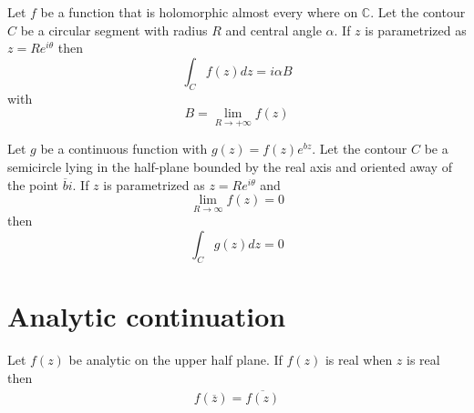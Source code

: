         \begin{theorem}\label{complexcalculus:theorem:great_limit}
		Let $f$ be a function that is holomorphic almost every where on $\mathbb{C}$. Let the contour $C$ be a circular segment with radius $R$ and central angle $\alpha$. If $z$ is parametrized as $z = Re^{i\theta}$ then\[\int_Cf(z)dz = i\alpha B\] with \[B = \lim_{R\rightarrow+\infty}f(z)\]
	\end{theorem}
	
        \begin{theorem}\label{complexcalculus:theorem:jordan}
		Let $g$ be a continuous function with $g(z) = f(z)e^{bz}$. Let the contour $C$ be a semicircle lying in the half-plane bounded by the real axis and oriented away of the point $\overline{b}i$. If $z$ is parametrized as $z=Re^{i\theta}$ and \[\lim_{R\rightarrow\infty}f(z) = 0\] then\[\int_Cg(z)dz = 0\]
	\end{theorem}
		
\section{Analytic continuation}

	\begin{theorem}
		Let $f(z)$ be analytic on the upper half plane. If $f(z)$ is real when $z$ is real then
	        \begin{gather}
	        	f(\overline{z}) = \overline{f(z)}
	        \end{gather}
	\end{theorem}
